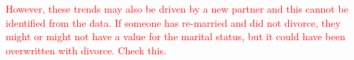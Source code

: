 \documentclass[a4paper,12pt]{article}
\theoremstyle{plain}
\theoremstyle{definition}
\theoremstyle{TheoremNum}
\theoremstyle{CorollaryNum}
\theoremstyle{PropositionNum}
\theoremstyle{TheoremNum}
\begin{document}
\textcolor{red}{However, these trends may also be driven by a new partner and this cannot be identified from the data. If someone has re-married and did not divorce, they might or might not have a value for the marital status, but it could have been overwritten with divorce. Check this.} 



\end{document}
